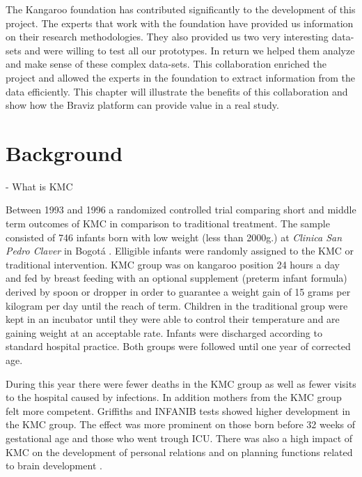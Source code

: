 \label{chap_kmc400}

The Kangaroo foundation has contributed significantly to the development of this project. The experts that work with the foundation have provided us information on their research methodologies. They also provided us two very interesting data-sets and were willing to test all our prototypes. In return we helped them analyze and make sense of these complex data-sets. This collaboration enriched the project and allowed the experts in the foundation to extract information from the data efficiently. This chapter will illustrate the benefits of this collaboration and show how the Braviz platform can provide value in a real study. 

\section{Background}


- What is KMC

Between 1993 and 1996 a randomized controlled trial comparing short and middle term outcomes of KMC in comparison to traditional treatment. The sample consisted of 746 infants born with low weight (less than 2000g.) at \emph{Clinica San Pedro Claver} in Bogotá \autocite{charpak_current_1996,charpak_kangaroo_1997,charpak_randomized_2001,charpak_kangaroo_2005}. Elligible infants were randomly assigned to the KMC or traditional intervention. KMC group was on kangaroo position 24 hours a day and fed by breast feeding with an optional supplement (preterm infant formula) derived by spoon or dropper in order to guarantee a weight gain of 15 grams per kilogram per day until the reach of term. Children in the traditional group were kept in an incubator until they were able to control their temperature and are gaining weight at an acceptable rate. Infants were discharged according to standard hospital practice. Both groups were followed until one year of corrected age. 


During this year there were fewer deaths in the KMC group as well as fewer visits to the hospital caused by infections. In addition mothers from the KMC group felt more competent. Griffiths and INFANIB tests showed higher development in the KMC group. The effect was more prominent on those born before 32 weeks of gestational age and those who went trough ICU. There was also a high impact of KMC on the development of personal relations and on planning functions related to brain development \autocite{tessier_kangaroo_2003}.

